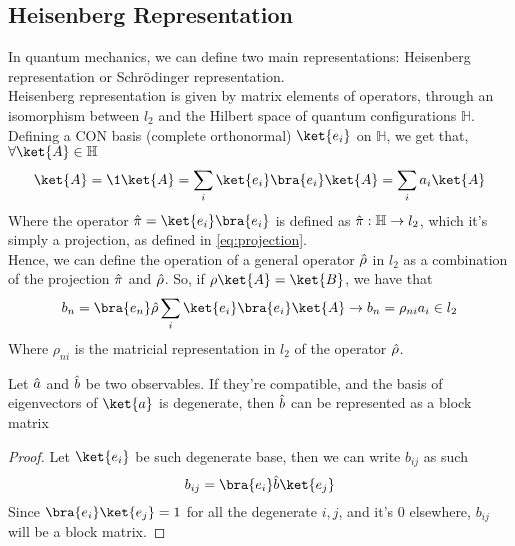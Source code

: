 \documentclass[../qm.tex]{subfiles}
\begin{document}
	\subsection{Heisenberg Representation}
	In quantum mechanics, we can define two main representations: Heisenberg representation or Schrödinger representation.\\
	Heisenberg representation is given by matrix elements of operators, through an isomorphism between $l_2$ and the Hilbert space of quantum configurations $\mathbb{H}$. Defining a CON basis (complete orthonormal) $\ket{e_i}$ on $\mathbb{H}$, we get that, $\forall\ket{A}\in\mathbb{H}$
	\begin{equation}
		\ket{A}=\1\ket{A}=\sum_i\ket{e_i}\bra{e_i}\ket{A}=\sum_ia_i\ket{A}
		\label{eq:Htol2isom}
	\end{equation}
	Where the operator $\opr{\pi}=\ket{e_i}\bra{e_i}$ is defined as $\hat{\pi}:\mathbb{H}\to l_2$, which it's simply a projection, as defined in \eqref{eq:projection}.\\
	Hence, we can define the operation of a general operator $\hat{\rho}$ in $l_2$ as a combination of the projection $\hat{\pi}$ and $\hat{\rho}$. So, if $\rho\ket{A}=\ket{B}$, we have that
	\begin{equation}
		b_n=\bra{e_n}\opr{\rho}\sum_i\ket{e_i}\bra{e_i}\ket{A}\rightarrow b_n=\rho_{ni}a_i\in l_2
		\label{eq:l2isom}
	\end{equation}
	Where $\rho_{ni}$ is the matricial representation in $l_2$ of the operator $\hat{\rho}$.\\
	\begin{thm}
		Let $\hat{a}$ and $\hat{b}$ be two observables. If they're compatible, and the basis of eigenvectors of $\ket{a}$ is degenerate, then $\hat{b}$ can be represented as a block matrix
	\end{thm}
	\begin{proof}
		Let $\ket{e_i}$ be such degenerate base, then we can write $b_{ij}$ as such
		\begin{equation*}
			b_{ij}=\bra{e_i}\opr{b}\ket{e_j}
		\end{equation*}
		Since $\bra{e_i}\ket{e_j}=1$ for all the degenerate $i,j$, and it's $0$ elsewhere, $b_{ij}$ will be a block matrix.
	\end{proof}
\end{document}
